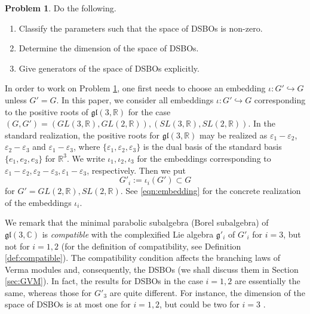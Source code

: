 \documentclass[a4paper,11pt,reqno]{amsart}
\newcommand{\frakg}{\mathfrak{g}}
\newcommand{\0}{{\bf 0}}
\newcommand{\R}{\mathbb{R}}
\newcommand{\C}{\mathbb{C}}
\newcommand{\1}{{\bf 1}}
\theoremstyle{plain}
\theoremstyle{definition}
\numberwithin{equation}{section}
\theoremstyle{definition}
\newtheorem{problem}{Problem}
\begin{document}
\begin{problem}\label{prob:class_const}
Do the following.

\begin{enumerate}[label = \normalfont{(\arabic*)}]

\item Classify the parameters such that the space of DSBOs is non-zero.
\vskip 0.1in

\item Determine the dimension of the space of DSBOs.
\vskip 0.1in

\item Give generators of the space of DSBOs explicitly.
\end{enumerate}

\end{problem}


In order to work on Problem \ref{prob:class_const}, one first needs to choose 
an embedding $\iota\colon G' \hookrightarrow G$ unless $G'=G$.
In this paper, we consider 
all embeddings $\iota\colon G' \hookrightarrow G$
corresponding to the positive roots of $\mathfrak{gl}(3,\R)$ 
for the case
$(G,G') = (GL(3,\R), GL(2,\R)),  (SL(3,\R), SL(2,\R))$. 
In the standard realization, the positive roots for $\mathfrak{gl}(3,\R)$ may be realized as
$\varepsilon_1-\varepsilon_2$, $\varepsilon_2-\varepsilon_3$ 
and $\varepsilon_1-\varepsilon_3$, where $\{\varepsilon_1, \varepsilon_2,\varepsilon_3\}$ is the dual basis
of the standard basis $\{e_1,e_2,e_3\}$ for $\R^3$. We write $\iota_1, \iota_2, \iota_3$ 
for the embeddings corresponding to
$\varepsilon_1-\varepsilon_2, \varepsilon_2-\varepsilon_3,
\varepsilon_1-\varepsilon_3$, respectively.
Then we put 
\begin{equation}\label{eqn:IntroEmb}
G'_i := \iota_i(G') \subset G
\end{equation}
for $G'=GL(2,\R), SL(2,\R)$.
See \eqref{eqn:embedding} for the concrete realization of the embeddings $\iota_i$.

We remark that the minimal parabolic subalgebra (Borel subalgebra) 
of $\mathfrak{gl}(3,\C)$ 
is \emph{compatible} with 
 the complexified Lie algebra $\frakg'_i$ of $G'_i$ 
for $i=3$, but not for $i=1,2$ 
(for the definition of compatibility, see Definition \ref{def:compatible}). 
The compatibility condition
affects the branching laws of Verma modules 
and, consequently, the DSBOs (we shall discuss them in Section \ref{sec:GVM}). 
In fact,
the results for DSBOs in the case $i=1,2$ are essentially the same,
whereas those for $G'_3$ are quite different.
For instance, the dimension of the space of DSBOs is at most one for 
$i=1,2$, but could be two for $i=3$ . 
\end{document}
